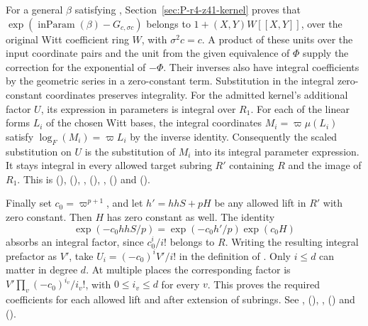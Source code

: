 For a general $\beta$ satisfying ,
Section~\ref{sec:P-r4-z41-kernel} proves that
$\exp(\operatorname{inParam}(\beta)-G_{c,\sigma c})$ belongs to
$1+(X,Y)W[[X,Y]]$, over the original Witt coefficient ring $W$,
with $\sigma^2c=c$. A product of these units over the input
coordinate pairs and the unit from the given equivalence of $\Phi$
supply the correction for the exponential of $-\Phi$. Their inverses
also have integral coefficients by the geometric series in a
zero-constant term. Substitution in the integral zero-constant
coordinates preserves integrality. For the admitted kernel's
additional factor $U$, its expression in parameters is integral over
$R_1$. For each of the linear forms $L_i$ of the chosen Witt bases,
the integral coordinates $M_i=\varpi\mu(L_i)$ satisfy
$\log_F(M_i)=\varpi L_i$ by the inverse identity. Consequently the
scaled substitution on $U$ is the substitution of $M_i$ into its
integral parameter expression. It stays integral in every allowed
target subring $R'$ containing $R$ and the image of $R_1$. This is
 (),
 (),
, 
(),
,  ()
and  ().

Finally set $c_0=\varpi^{p+1}$, and let $h'=hhS+pH$ be any allowed
lift in $R'$ with zero constant. Then $H$ has zero constant as well.
The identity
\[
   \exp(-c_0 hhS/p)=\exp(-c_0h'/p)\exp(c_0H)
\]
absorbs an integral factor, since $c_0^i/i!$ belongs to $R$.
Writing the resulting integral prefactor as $V'$, take
$U_i=(-c_0)^i V'/i!$ in the definition of .
Only $i\le d$ can matter in degree $d$. At multiple places the
corresponding factor is $V'\prod_v(-c_0)^{i_v}/i_v!$,
with $0\le i_v\le d$ for every $v$. This proves the required
coefficients for each allowed lift and after extension of subrings.
See , 
(),
, 
() and 
().

